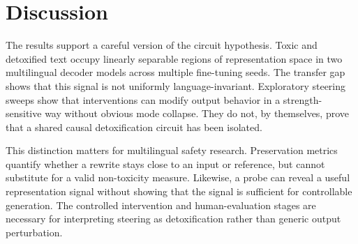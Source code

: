 \section{Discussion}

The results support a careful version of the circuit hypothesis. Toxic and detoxified
text occupy linearly separable regions of representation space in two multilingual
decoder models across multiple fine-tuning seeds. The transfer gap shows that this
signal is not uniformly language-invariant. Exploratory steering sweeps show that
interventions can modify output behavior in a strength-sensitive way without obvious
mode collapse. They do not, by themselves, prove that a shared causal detoxification
circuit has been isolated.

This distinction matters for multilingual safety research. Preservation metrics quantify
whether a rewrite stays close to an input or reference, but cannot substitute for a
valid non-toxicity measure. Likewise, a probe can reveal a useful representation signal
without showing that the signal is sufficient for controllable generation. The
controlled intervention and human-evaluation stages are necessary for interpreting
steering as detoxification rather than generic output perturbation.
